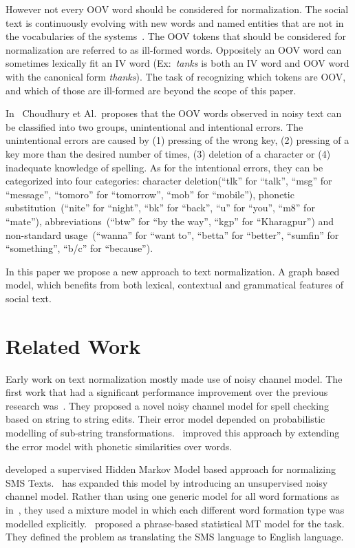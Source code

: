 \documentclass[preprint,review,12pt]{elsarticle}
\begin{document}
However not every OOV word should be considered for normalization. The social text is continuously evolving with new words and named entities that are not in the vocabularies of the systems~\cite{DBLP:conf/acl/HassanM13}. The OOV tokens that should be considered for normalization are referred to as ill-formed words. Oppositely an OOV word can sometimes lexically fit an IV word (Ex:~\textit{tanks} is both an IV word and OOV word with the canonical form \textit{thanks}). The task of recognizing which tokens are OOV, and which of those are ill-formed are beyond the scope of this paper.

In~\cite{Choudhury:2007:IMS:1326044.1326048} Choudhury et Al.~proposes that the OOV words observed in noisy text can be classified into two groups, unintentional and intentional errors. The unintentional errors are caused by (1) pressing of the wrong key, (2) pressing of a key more than the desired number of times, (3) deletion of a character or (4) inadequate knowledge of spelling. As for the intentional errors, they can be categorized into four categories: character deletion(``tlk'' for ``talk'', ``msg'' for ``message'', ``tomoro'' for ``tomorrow'', ``mob'' for ``mobile''), phonetic substitution~(``nite'' for ``night'', ``bk'' for ``back'', ``u'' for ``you'', ``m8'' for ``mate''), abbreviations~(``btw'' for ``by the way'', ``kgp'' for ``Kharagpur'') and non-standard usage~(``wanna'' for ``want to'', ``betta'' for ``better'', ``sumfin'' for ``something'', ``b/c'' for ``because'').

In this paper we propose a new approach to text normalization. A graph based model, which benefits from both lexical, contextual and grammatical features of social text.

\section{Related Work}
\label{sec:related}

Early work on text normalization mostly made use of noisy channel model. The first work that had a significant performance improvement over the previous research was~\cite{Brill:2000:IEM:1075218.1075255}. They proposed a novel noisy channel model for spell checking based on string to string edits. Their error model depended on probabilistic modelling of sub-string transformations.~\cite{Toutanova:2002:PMI:1073083.1073109} improved this approach by extending the error model with phonetic similarities over words.

\cite{Choudhury:2007:IMS:1326044.1326048} developed a supervised Hidden Markov Model based approach for normalizing SMS Texts.~\cite{Cook:2009:UMT:1642011.1642021} has expanded this model by introducing an unsupervised noisy channel model. Rather than using one generic model for all word formations as in~\cite{Choudhury:2007:IMS:1326044.1326048}, they used a mixture model in which each different word formation type was modelled explicitly.~\cite{Aw:2006:PSM:1273073.1273078} proposed a phrase-based statistical MT model for the task. They defined the problem as translating the SMS language to English language.
\end{document}
